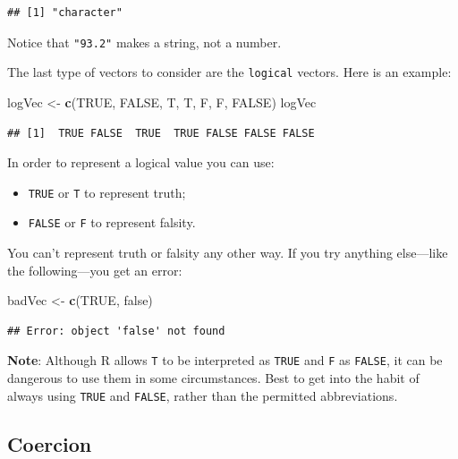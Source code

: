 \documentclass[]{book}
\makeatletter
\newenvironment{Shaded}{\begin{snugshade}}{\end{snugshade}}
\newcommand{\KeywordTok}[1]{\textcolor[rgb]{0.13,0.29,0.53}{\textbf{#1}}}
\newcommand{\StringTok}[1]{\textcolor[rgb]{0.31,0.60,0.02}{#1}}
\newcommand{\OtherTok}[1]{\textcolor[rgb]{0.56,0.35,0.01}{#1}}
\newcommand{\NormalTok}[1]{#1}
\providecommand{\tightlist}{%
  \setlength{\itemsep}{0pt}\setlength{\parskip}{0pt}}
\newenvironment{kframe}{%
\medskip{}
\setlength{\fboxsep}{.8em}
 \def\at@end@of@kframe{}%
 \ifinner\ifhmode%
  \def\at@end@of@kframe{\end{minipage}}%
  \begin{minipage}{\columnwidth}%
 \fi\fi%
 \def\FrameCommand##1{\hskip\@totalleftmargin \hskip-\fboxsep
 \colorbox{shadecolor}{##1}\hskip-\fboxsep
     \hskip-\linewidth \hskip-\@totalleftmargin \hskip\columnwidth}%
 \MakeFramed {\advance\hsize-\width
   \@totalleftmargin\z@ \linewidth\hsize
   \@setminipage}}%
 {\par\unskip\endMakeFramed%
 \at@end@of@kframe}
\renewenvironment{Shaded}{\begin{kframe}}{\end{kframe}}
\theoremstyle{definition}
\theoremstyle{definition}
\theoremstyle{definition}
\theoremstyle{remark}
\makeatother
\begin{document}
\begin{verbatim}
## [1] "character"
\end{verbatim}

Notice that \texttt{"93.2"} makes a string, not a number.

The last type of vectors to consider are the
\texttt{logical} vectors. Here is an example:

\begin{Shaded}
\begin{Highlighting}[]
\NormalTok{logVec <-}\StringTok{ }\KeywordTok{c}\NormalTok{(}\OtherTok{TRUE}\NormalTok{, }\OtherTok{FALSE}\NormalTok{, T, T, F, F, }\OtherTok{FALSE}\NormalTok{)}
\NormalTok{logVec}
\end{Highlighting}
\end{Shaded}

\begin{verbatim}
## [1]  TRUE FALSE  TRUE  TRUE FALSE FALSE FALSE
\end{verbatim}

In order to represent a logical value you can use:

\begin{itemize}
\tightlist
\item
  \texttt{TRUE} or \texttt{T} to represent truth;
\item
  \texttt{FALSE} or \texttt{F} to represent falsity.
\end{itemize}

You can't represent truth or falsity any other way. If you try anything
else---like the following---you get an error:

\begin{Shaded}
\begin{Highlighting}[]
\NormalTok{badVec <-}\StringTok{ }\KeywordTok{c}\NormalTok{(}\OtherTok{TRUE}\NormalTok{, false)}
\end{Highlighting}
\end{Shaded}

\begin{verbatim}
## Error: object 'false' not found
\end{verbatim}

\textbf{Note}: Although R allows \texttt{T} to be interpreted as
\texttt{TRUE} and \texttt{F} as \texttt{FALSE}, it can be dangerous to
use them in some circumstances. Best to get into the habit of always
using \texttt{TRUE} and \texttt{FALSE}, rather than the permitted
abbreviations.

\subsection{Coercion}\label{coercion}
\end{document}
